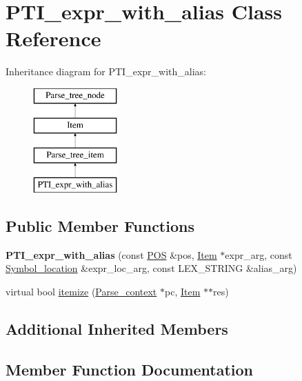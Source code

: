 \hypertarget{classPTI__expr__with__alias}{}\section{P\+T\+I\+\_\+expr\+\_\+with\+\_\+alias Class Reference}
\label{classPTI__expr__with__alias}
Inheritance diagram for P\+T\+I\+\_\+expr\+\_\+with\+\_\+alias\+:\begin{figure}[H]
\begin{center}
\leavevmode
\includegraphics[height=4.000000cm]{classPTI__expr__with__alias}
\end{center}
\end{figure}
\subsection*{Public Member Functions}
\begin{DoxyCompactItemize}
\item 
\mbox{\label{classPTI__expr__with__alias_aebbd4ad9f66d463019182db1f9f6c08a}} 
{\bfseries P\+T\+I\+\_\+expr\+\_\+with\+\_\+alias} (const \mbox{\hyperlink{structYYLTYPE}{P\+OS}} \&pos, \mbox{\hyperlink{classItem}{Item}} $\ast$expr\+\_\+arg, const \mbox{\hyperlink{structSymbol__location}{Symbol\+\_\+location}} \&expr\+\_\+loc\+\_\+arg, const L\+E\+X\+\_\+\+S\+T\+R\+I\+NG \&alias\+\_\+arg)
\item 
virtual bool \mbox{\hyperlink{classPTI__expr__with__alias_ac48c4703a1ae10a3176505e9b44603c5}{itemize}} (\mbox{\hyperlink{structParse__context}{Parse\+\_\+context}} $\ast$pc, \mbox{\hyperlink{classItem}{Item}} $\ast$$\ast$res)
\end{DoxyCompactItemize}
\subsection*{Additional Inherited Members}


\subsection{Member Function Documentation}
\mbox{\label{classPTI__expr__with__alias_ac48c4703a1ae10a3176505e9b44603c5}} 
